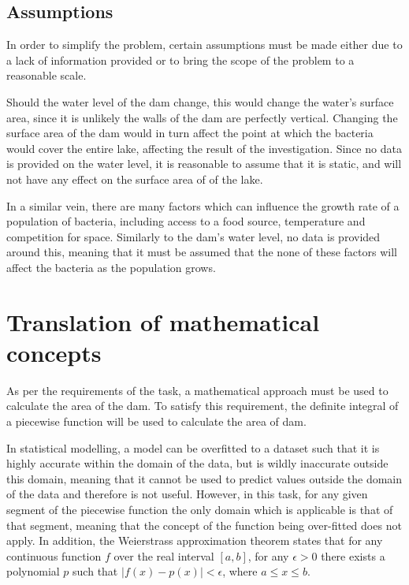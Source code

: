 \documentclass{article}
\begin{document}
    
    \subsection{Assumptions}
    
    In order to simplify the problem, certain assumptions must be made either due to a lack of information provided or to bring the scope of the problem to a reasonable scale.

    Should the water level of the dam change, this would change the water's surface area, since it is unlikely the walls of the dam are perfectly vertical. Changing the surface area of the dam would in turn affect the point at which the bacteria would cover the entire lake, affecting the result of the investigation. Since no data is provided on the water level, it is reasonable to assume that it is static, and will not have any effect on the surface area of of the lake.

    In a similar vein, there are many factors which can influence the growth rate of a population of bacteria, including access to a food source, temperature and competition for space. Similarly to the dam's water level, no data is provided around this, meaning that it must be assumed that the none of these factors will affect the bacteria as the population grows.
    
\section{Translation of mathematical concepts}

    As per the requirements of the task, a mathematical approach must be used to calculate the area of the dam. To satisfy this requirement, the definite integral of a piecewise function will be used to calculate the area of dam.

    In statistical modelling, a model can be overfitted to a dataset such that it is highly accurate within the domain of the data, but is wildly inaccurate outside this domain, meaning that it cannot be used to predict values outside the domain of the data and therefore is not useful. However, in this task, for any given segment of the piecewise function the only domain which is applicable is that of that segment, meaning that the concept of the function being over-fitted does not apply. In addition, the Weierstrass approximation theorem states that for any continuous function $f$ over the real interval $[a, b]$, for any $\epsilon > 0$ there exists a polynomial $p$ such that $|f(x) - p(x)| < \epsilon$, where $a \leq x \leq b$.
 
\end{document}
